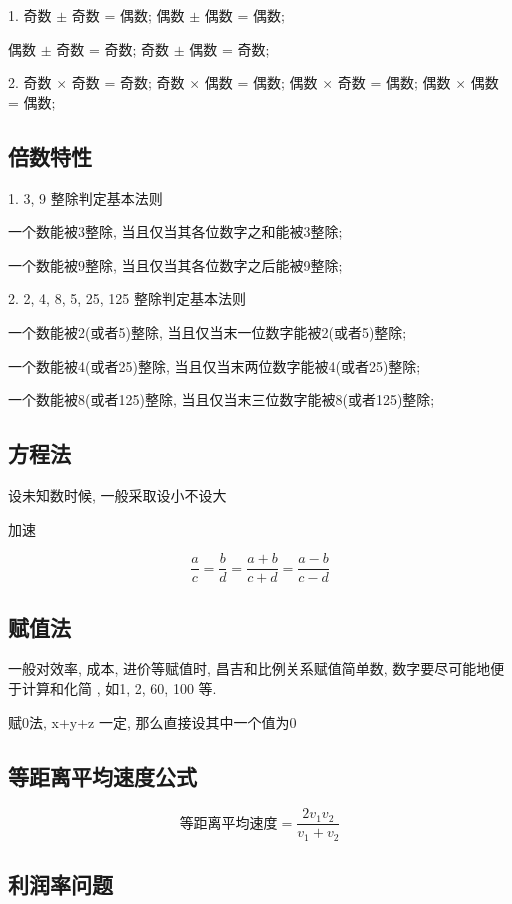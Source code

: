 1. 奇数 $\pm$ 奇数 = 偶数; 偶数 $\pm$ 偶数 = 偶数;

偶数 $\pm$ 奇数 = 奇数; 奇数 $\pm$ 偶数 = 奇数;

2. 奇数 $\times$ 奇数 = 奇数; 奇数 $\times$ 偶数 = 偶数;
偶数 $\times$ 奇数 = 偶数; 偶数 $\times$ 偶数 = 偶数;


\subsection{倍数特性}
1. 3, 9 整除判定基本法则

一个数能被3整除, 当且仅当其各位数字之和能被3整除;

一个数能被9整除, 当且仅当其各位数字之后能被9整除;

2. 2, 4, 8, 5, 25, 125 整除判定基本法则

一个数能被2(或者5)整除, 当且仅当末一位数字能被2(或者5)整除;

一个数能被4(或者25)整除, 当且仅当末两位数字能被4(或者25)整除;

一个数能被8(或者125)整除, 当且仅当末三位数字能被8(或者125)整除;

\subsection{方程法}

设未知数时候, 一般采取设小不设大

加速


$$
	\frac{a}{c} = \frac{b}{d} = \frac{a+b}{c+d} = \frac{a-b}{c-d}
$$


\subsection{赋值法}

一般对效率, 成本, 进价等赋值时, 昌吉和比例关系赋值简单数, 数字要尽可能地便于计算和化简
, 如1, 2, 60, 100 等.

赋0法, x+y+z 一定, 那么直接设其中一个值为0

\subsection{等距离平均速度公式}

$$
	\mbox{等距离平均速度} = \frac{2v_1 v_2}{v_1 + v_2}
$$

\subsection{利润率问题}

